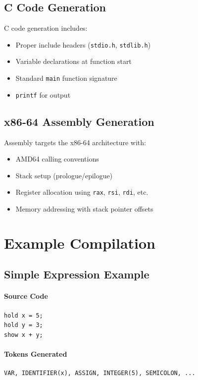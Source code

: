 \documentclass[12pt,a4paper]{report}
\begin{document}
\section{C Code Generation}

C code generation includes:
\begin{itemize}
    \item Proper include headers (\texttt{stdio.h}, \texttt{stdlib.h})
    \item Variable declarations at function start
    \item Standard \texttt{main} function signature
    \item \texttt{printf} for output
\end{itemize}

\section{x86-64 Assembly Generation}

Assembly targets the x86-64 architecture with:
\begin{itemize}
    \item AMD64 calling conventions
    \item Stack setup (prologue/epilogue)
    \item Register allocation using \texttt{rax}, \texttt{rsi}, \texttt{rdi}, etc.
    \item Memory addressing with stack pointer offsets
\end{itemize}

\chapter{Example Compilation}

\section{Simple Expression Example}

\subsubsection{Source Code}
\begin{lstlisting}
hold x = 5;
hold y = 3;
show x + y;
\end{lstlisting}

\subsubsection{Tokens Generated}
\begin{verbatim}
VAR, IDENTIFIER(x), ASSIGN, INTEGER(5), SEMICOLON, ...
\end{verbatim}
\end{document}
